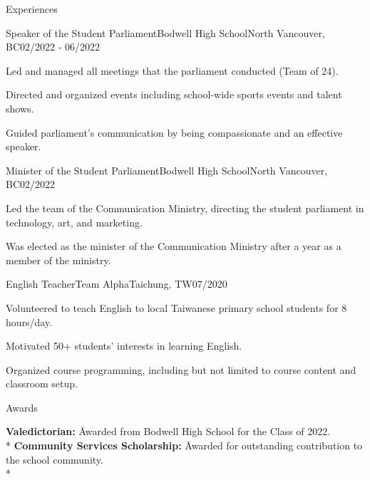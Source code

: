 \documentclass{article}
\newlength{\tabin}
\newlength{\secsep}
\newcommand{\lineunder}{\vspace*{-8pt} \\ \hspace*{-6pt} \hrulefill \\ \vspace*{-15pt}}
\newenvironment{tabbedsection}[1]{
  \begin{list}{}{
      \setlength{\itemsep}{0pt}
      \setlength{\labelsep}{0pt}
      \setlength{\labelwidth}{0pt}
      \setlength{\leftmargin}{\tabin}
      \setlength{\rightmargin}{\tabin}
      \setlength{\listparindent}{0pt}
      \setlength{\parsep}{0pt}
      \setlength{\parskip}{0pt}
      \setlength{\partopsep}{0pt}
      \setlength{\topsep}{#1}
    }
  \item[]
}{\end{list}}
\newenvironment{nospacetabbing}{
    \begin{tabbing}
}{\end{tabbing}\vspace{-1.2em}}
\newenvironment{resume_section}[1]{
  \filbreak
  \vspace{2\secsep}
  \textsc{\large#1}
  \lineunder
  \begin{tabbedsection}{\secsep}
}{\end{tabbedsection}}
\newenvironment{subitems}{
  \renewcommand{\labelitemi}{-}
  \begin{itemize}
      \setlength{\labelsep}{1em}
}{\end{itemize}}
\newenvironment{resume_employer}[4]{
  \vspace{\secsep}
  \textbf{#1} {\footnotesize #3} \hfill {\footnotesize#4} \hspace{-1em} \\
  \small{#2}  
  \vspace{\secsep}
  \begin{tabbedsection}{0pt}
  \begin{subitems}
}{\end{subitems}\end{tabbedsection}}
\begin{document}
\begin{resume_section}{Experiences}
  \begin{resume_employer}{Speaker of the Student Parliament}{Bodwell High School}{North Vancouver, BC}{02/2022 - 06/2022}
    \item Led and managed all meetings that the parliament conducted (Team of 24).
    \item Directed and organized events including school-wide sports events and talent shows.
    \item Guided parliament's communication by being compassionate and an effective speaker.
  \end{resume_employer}

  \begin{resume_employer}{Minister of the Student Parliament}{Bodwell High School}{North Vancouver, BC}{02/2022}
    \item Led the team of the Communication Ministry, directing the student parliament in technology, art, and marketing.
    \item Was elected as the minister of the Communication Ministry after a year as a member of the ministry.
  \end{resume_employer}

  \begin{resume_employer}{English Teacher}{Team Alpha}{Taichung, TW}{07/2020}
    \item Volunteered to teach English to local Taiwanese primary school students for 8 hours/day.
    \item Motivated 50+ students' interests in learning English.
    \item Organized course programming, including but not limited to course content and classroom setup.
  \end{resume_employer}

\end{resume_section}
  
\begin{resume_section}{Awards}
  \begin{nospacetabbing}
    \textbf{Valedictorian:} \= Awarded from Bodwell High School for the Class of 2022.\\*
    \textbf{Community Services Scholarship:} \= Awarded for outstanding contribution to the school community.\\*
  \end{nospacetabbing}
\end{resume_section}
\end{document}
